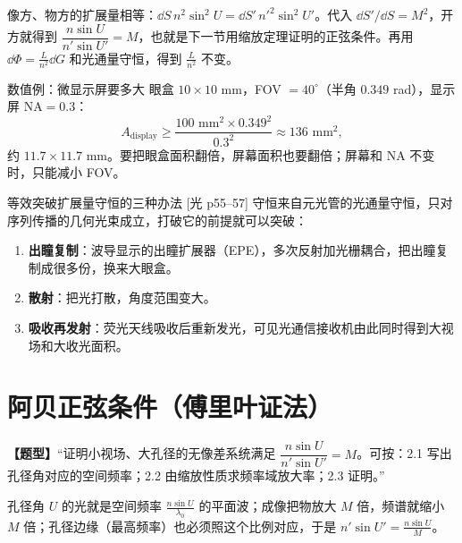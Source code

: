 \begin{idea}[和阿贝正弦条件是同一件事]
像方、物方的扩展量相等：$\dd S\,n^2\sin^2U=\dd S'\,n'^2\sin^2U'$。代入 $\dd S'/\dd S=M^2$，开方就得到 $\dfrac{n\sin U}{n'\sin U'}=M$，也就是下一节用缩放定理证明的正弦条件。再用 $\dd\Phi=\frac{L}{n^2}\dd G$ 和光通量守恒，得到 $\frac{L}{n^2}$ 不变。
\end{idea}

\begin{exam}{数值例：微显示屏要多大}
眼盒 $10\times10$ mm，FOV $=40^\circ$（半角 $0.349$ rad），显示屏 $\mathrm{NA}=0.3$：
\[
A_\text{display}\ge\frac{100\text{ mm}^2\times0.349^2}{0.3^2}\approx136\text{ mm}^2,
\]
约 $11.7\times11.7$ mm。要把眼盒面积翻倍，屏幕面积也要翻倍；屏幕和 NA 不变时，只能减小 FOV。
\end{exam}

\begin{recipe}{等效突破扩展量守恒的三种办法 [光 p55--57]}
守恒来自元光管的光通量守恒，只对序列传播的几何光束成立，打破它的前提就可以突破：
\begin{enumerate}
\item \textbf{出瞳复制}：波导显示的出瞳扩展器（EPE），多次反射加光栅耦合，把出瞳复制成很多份，换来大眼盒。
\item \textbf{散射}：把光打散，角度范围变大。
\item \textbf{吸收再发射}：荧光天线吸收后重新发光，可见光通信接收机由此同时得到大视场和大收光面积。
\end{enumerate}
\end{recipe}

\section{阿贝正弦条件（傅里叶证法）}\label{sec:abbesine}
\textbf{【题型】}“证明小视场、大孔径的无像差系统满足 $\dfrac{n\sin U}{n'\sin U'}=M$。可按：2.1 写出孔径角对应的空间频率；2.2 由缩放性质求频率域放大率；2.3 证明。”

\begin{idea}[一句话]
孔径角 $U$ 的光就是空间频率 $\frac{n\sin U}{\lambda_0}$ 的平面波；成像把物放大 $M$ 倍，频谱就缩小 $M$ 倍；孔径边缘（最高频率）也必须照这个比例对应，于是 $n'\sin U'=\frac{n\sin U}{M}$。
\end{idea}

